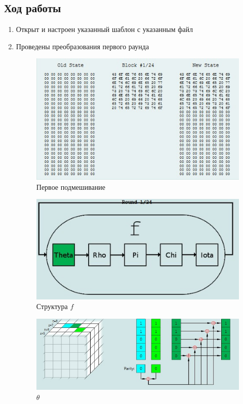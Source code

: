 \documentclass[a4paper, 14pt]{extarticle}
\begin{document}
\subsection{Ход работы}
\begin{enumerate}
    \item Открыт и настроен указанный шаблон с указанным файл
    \item Проведены преобразования первого раунда
        \begin{figure}[h]
            \centering
            \includegraphics[width=\textwidth]{img/S006.jpg}
            \caption{Первое подмешивание}%
            \label{img:}
        \end{figure}

        \begin{figure}[h]
            \centering
            \includegraphics[width=\textwidth]{img/S007.jpg}
            \caption{Структура $f$}%
        \end{figure}

        \begin{figure}[h]
            \centering
            \includegraphics[width=\textwidth]{img/S008.jpg}
            \caption{$\theta$}%
        \end{figure}


\end{enumerate}
\end{document}
